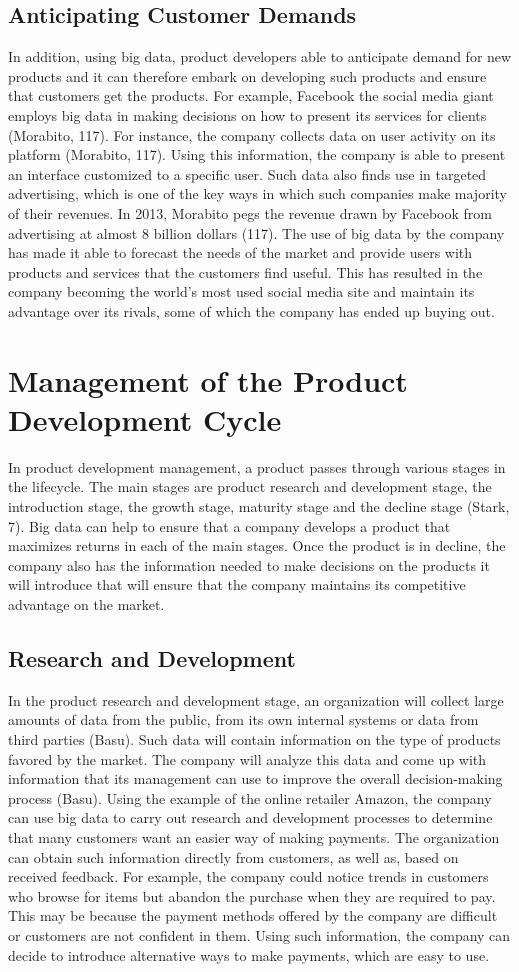 \documentclass[sigconf]{acmart}
\begin{document}
\subsection{Anticipating Customer Demands}
In addition, using big data, product developers able to anticipate demand for new products and it can therefore embark on developing such products and ensure that customers get the products. For example, Facebook the social media giant employs big data in making decisions on how to present its services for clients (Morabito, 117). For instance, the company collects data on user activity on its platform (Morabito, 117). Using this information, the company is able to present an interface customized to a specific user. Such data also finds use in targeted advertising, which is one of the key ways in which such companies make majority of their revenues. In 2013, Morabito pegs the revenue drawn by Facebook from advertising at almost  8 billion dollars (117). The use of big data by the company has made it able to forecast the needs of the market and provide users with products and services that the customers find useful. This has resulted in the company becoming the world’s most used social media site and maintain its advantage over its rivals, some of which the company has ended up buying out.
\section{Management of the Product Development Cycle}
In product development management, a product passes through various stages in the lifecycle. The main stages are product research and development stage, the introduction stage, the growth stage, maturity stage and the decline stage (Stark, 7). Big data can help to ensure that a company develops a product that maximizes returns in each of the main stages. Once the product is in decline, the company also has the information needed to make decisions on the products it will introduce that will ensure that the company maintains its competitive advantage on the market. 
\subsection{Research and Development}
In the product research and development stage, an organization will collect large amounts of data from the public, from its own internal systems or data from third parties (Basu). Such data will contain information on the type of products favored by the market. The company will analyze this data and come up with information that its management can use to improve the overall decision-making process (Basu). 
Using the example of the online retailer Amazon, the company can use big data to carry out research and development processes to determine that many customers want an easier way of making payments. The organization can obtain such information directly from customers, as well as, based on received feedback. For example, the company could notice trends in customers who browse for items but abandon the purchase when they are required to pay. This may be because the payment methods offered by the company are difficult or customers are not confident in them. Using such information, the company can decide to introduce alternative ways to make payments, which are easy to use.
\end{document}
